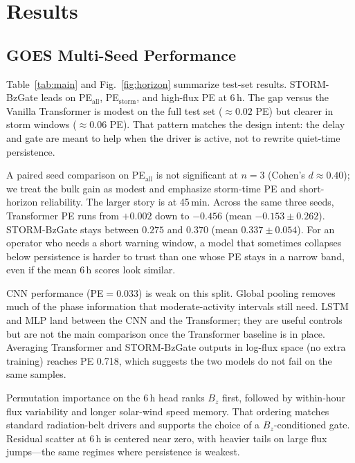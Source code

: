 \documentclass[conference]{IEEEtran}
\begin{document}
\section{Results}

\subsection{GOES Multi-Seed Performance}
Table~\ref{tab:main} and Fig.~\ref{fig:horizon} summarize
test-set results. STORM-BzGate leads on PE\(_\mathrm{all}\), PE\(_\mathrm{storm}\),
and high-flux PE at 6\,h. The gap versus the Vanilla Transformer is modest
on the full test set (\(\approx 0.02\) PE) but clearer in storm windows
(\(\approx 0.06\) PE). That pattern matches the design intent: the delay and
gate are meant to help when the driver is active, not to rewrite quiet-time
persistence.

A paired seed comparison on PE\(_\mathrm{all}\) is not significant at \(n=3\) (Cohen's \(d\approx0.40\)); we treat the bulk gain as modest and emphasize storm-time PE and short-horizon reliability.
The larger story is at 45\,min. Across the same three seeds, Transformer PE
runs from \(+0.002\) down to \(-0.456\) (mean \(-0.153\pm0.262\)). STORM-BzGate
stays between \(0.275\) and \(0.370\) (mean \(0.337\pm0.054\)). For an operator
who needs a short warning window, a model that sometimes collapses below
persistence is harder to trust than one whose PE stays in a narrow band,
even if the mean 6\,h scores look similar.

CNN performance (PE\(=0.033\)) is weak on this split. Global pooling removes
much of the phase information that moderate-activity intervals still need.
LSTM and MLP land between the CNN and the Transformer; they are useful
controls but are not the main comparison once the Transformer baseline is in
place. Averaging Transformer and STORM-BzGate outputs in log-flux space
(no extra training) reaches PE 0.718, which suggests the two models do not
fail on the same samples.

Permutation importance on the \(6\,\mathrm{h}\) head ranks \(B_z\) first, followed
by within-hour flux variability and longer solar-wind speed memory. That
ordering matches standard radiation-belt drivers and supports the choice of a
\(B_z\)-conditioned gate. Residual scatter at \(6\,\mathrm{h}\) is centered near
zero, with heavier tails on large flux jumps---the same regimes where
persistence is weakest.
\end{document}
